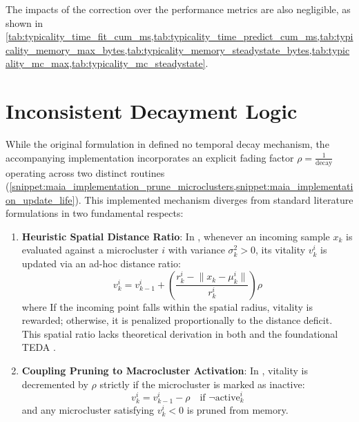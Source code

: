 




The impacts of the correction over the performance metrics are also negligible, as shown in \cref{tab:typicality_time_fit_cum_ms,tab:typicality_time_predict_cum_ms,tab:typicality_memory_max_bytes,tab:typicality_memory_steadystate_bytes,tab:typicality_mc_max,tab:typicality_mc_steadystate}.








\section{Inconsistent Decayment Logic}
\label{sec:inconsistent_decayment_logic}

While the original formulation in \cite{maia2020evolvclus} defined no temporal decay mechanism, the accompanying implementation incorporates an explicit fading factor $\rho = \frac{1}{\text{decay}}$ operating across two distinct routines (\cref{snippet:maia_implementation_prune_microclusters,snippet:maia_implementation_update_life}). This implemented mechanism diverges from standard literature formulations in two fundamental respects:

\begin{enumerate}
    \item \textbf{Heuristic Spatial Distance Ratio}: In , whenever an incoming sample $x_k$ is evaluated against a microcluster $i$ with variance $\sigma_k^2 > 0$, its vitality $v_k^i$ is updated via an ad-hoc distance ratio:
    \begin{equation}
        v_k^i = v_{k-1}^i + \left(\frac{r_k^i - \lVert x_k - \mu_k^i \rVert}{r_k^i}\right) \rho
        \label{eq:heuristic_distance_decay}
    \end{equation}
    where If the incoming point falls within the spatial radius, vitality is rewarded; otherwise, it is penalized proportionally to the distance deficit. This spatial ratio lacks theoretical derivation in both \MicroTEDAClus \cite{maia2020evolvclus} and the foundational TEDA \cite{angelov2014outside}.
    \item \textbf{Coupling Pruning to Macrocluster Activation}: In , vitality is decremented by $\rho$ strictly if the microcluster is marked as inactive:
    \begin{equation}
        v_k^i = v_{k-1}^i - \rho \quad \text{if } \neg \text{active}_k^i
        \label{eq:activation_coupled_pruning}
    \end{equation}
    and any microcluster satisfying $v_k^i < 0$ is pruned from memory.
\end{enumerate}

